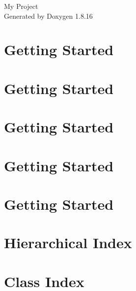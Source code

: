 \let\mypdfximage\pdfximage\def\pdfximage{\immediate\mypdfximage}\documentclass[twoside]{book}
\newcommand{\+}{\discretionary{\mbox{\scriptsize$\hookleftarrow$}}{}{}}
\newcommand{\clearemptydoublepage}{%
  \newpage{\pagestyle{empty}\cleardoublepage}%
}
\begin{document}
\hypersetup{pageanchor=false,
             bookmarksnumbered=true,
             pdfencoding=unicode
            }
\begin{titlepage}
\vspace*{7cm}
\begin{center}%
{\Large My Project }\\
\vspace*{1cm}
{\large Generated by Doxygen 1.8.16}\\
\end{center}
\end{titlepage}
\clearemptydoublepage
{}
\tableofcontents
\clearemptydoublepage
{}
\hypersetup{pageanchor=true}

\chapter{Getting Started}
\label{md_beacon-service__h_e_l_p}

\chapter{Getting Started}
\label{md_discovery-service__h_e_l_p}

\chapter{Getting Started}
\label{md__h_e_l_p}

\chapter{Getting Started}
\label{md_poi-service__h_e_l_p}

\chapter{Getting Started}
\label{md_proxy-service__h_e_l_p}

\chapter{Hierarchical Index}

\chapter{Class Index}

\end{document}
